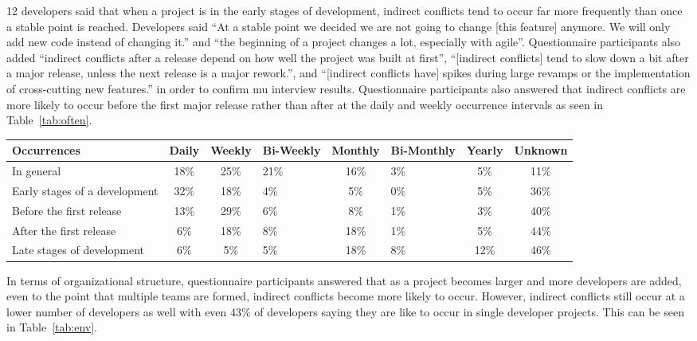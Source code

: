 12 developers said that
when a project is in the early stages of development, indirect conflicts tend to occur far more frequently
than once a stable point is reached. Developers said ``At a stable point we decided we are not going to change
[this feature] anymore. We will only add new code instead of changing it.'' and ``the beginning of a project
changes a lot, especially with agile''. Questionnaire participants also added ``indirect conflicts after a release
depend on how well the project was built at first'', ``[indirect conflicts] tend to slow down a bit after a
major release, unless the next release is a major rework.'', and ``[indirect conflicts have] spikes during
large revamps or the implementation of cross-cutting new features.'' in order to confirm mu interview results.
Questionnaire participants also answered that
indirect conflicts are more likely to occur before the first major release rather than after at the daily
and weekly occurrence intervals as seen in Table~\ref{tab:often}.

\begin{table*}[tb!]
\begin{center}
\begin{tabular}{| p{2cm} | c | c | p{1.2cm} | c | p{1.3cm} | c | c |}
\hline
Occurrences & Daily & Weekly & Bi-Weekly & Monthly & Bi-Monthly & Yearly & Unknown \\
\hline
\hline
In general & 18\% & 25\% & 21\% & 16\% & 3\% & 5\% & 11\% \\ \hline
Early stages of a development & 32\% & 18\% & 4\% & 5\% & 0\% & 5\% & 36\% \\ \hline
Before the first release & 13\% & 29\% & 6\% & 8\% & 1\% & 3\% & 40\% \\ \hline
After the first release & 6\% & 18\% & 8\% & 18\% & 1\% & 5\% & 44\% \\ \hline
Late stages of development & 6\% & 5\% & 5\% & 18\% & 8\% & 12\% & 46\% \\ \hline
\end{tabular}
\end{center}
\caption{Results of questionnaire as to how often indirect conflicts occur, in terms of percentage
of questionnaire participants.\label{tab:often}}
\end{table*}

In terms of organizational structure, questionnaire participants answered that as a project becomes larger and more
developers are added, even to the point that multiple teams are formed, indirect conflicts become more likely to
occur. However, indirect conflicts still occur at a lower number of developers as well with even 43\% of developers
saying they are like to occur in single developer projects. This can be seen in Table~\ref{tab:env}.

